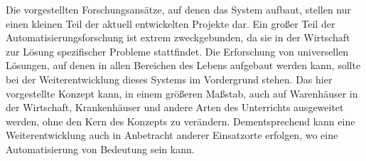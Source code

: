 Die vorgestellten Forschungsansätze, auf denen das System aufbaut, stellen nur einen kleinen Teil der aktuell entwickelten Projekte dar. Ein großer Teil der Automatisierungsforschung ist extrem zweckgebunden, da sie in der Wirtschaft zur Lösung spezifischer Probleme stattfindet. Die Erforschung von universellen Lösungen, auf denen in allen Bereichen des Lebens aufgebaut werden kann, sollte bei der Weiterentwicklung dieses Systems im Vordergrund stehen. Das hier vorgestellte Konzept kann, in einem größeren Maßstab, auch auf Warenhäuser in der Wirtschaft, Krankenhäuser und andere Arten des Unterrichts ausgeweitet werden, ohne den Kern des Konzepts zu verändern. Dementsprechend kann eine Weiterentwicklung auch in Anbetracht anderer Einsatzorte erfolgen, wo eine Automatisierung von Bedeutung sein kann.